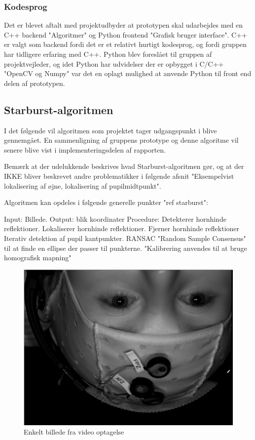 \documentclass[rapport.tex]{subfiles}
\begin{document}
	
	
	\subsubsection{Kodesprog}
	Det er blevet aftalt med projektudbyder at prototypen skal udarbejdes med en C++ backend "Algoritmer" og Python frontend "Grafisk bruger interface".
	C++ er valgt som backend fordi det er et relativt hurtigt kodesprog, og fordi gruppen har tidligere erfaring
	med C++. Python blev foreslået til gruppen af projektvejleder, og idet Python har udvidelser der er opbygget
	i C/C++ "OpenCV og Numpy" var det en oplagt mulighed at anvende Python til front end delen af prototypen.
	                           
	\subsection{Starburst-algoritmen}
	I det følgende vil algoritmen som projektet tager udgangspunkt i blive gennemgået. En sammenligning af gruppens prototype og denne algoritme vil
	senere blive vist i implementeringsdelen af rapporten.
	
	Bemærk at der udelukkende beskrives hvad Starburst-algoritmen gør, og at der IKKE bliver beskrevet andre problematikker i følgende afsnit "Eksempelvist lokalisering af øjne, lokalisering af pupilmidtpunkt".
	
	Algoritmen kan opdeles i følgende generelle punkter "ref starburst":
	
	Input: Billede.
	Output: blik koordinater
	Procedure:
	Detekterer hornhinde reflektioner.
	Lokaliserer hornhinde reflektioner.
	Fjerner hornhinde reflektioner
	Iterativ detektion af pupil kantpunkter.
	RANSAC "Random Sample Consensus" til at finde en ellipse der passer til punkterne.
	"Kalibrering anvendes til at bruge homografisk mapning"
	
	\begin{figure}
	\centering
	\includegraphics[width=0.4\linewidth]{Billeder/Initial Image.png}
	\caption{Enkelt billede fra video optagelse}
	\label{fig:InitialImage}
	\end{figure}
	
\end{document}

